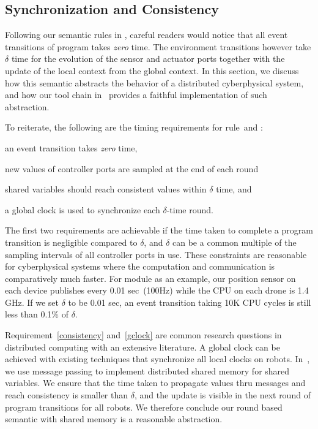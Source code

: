 \subsection{Synchronization and Consistency}
\label{sec:sync}

Following our semantic rules in ,
careful readers would notice that all event transitions of \lgname program takes \emph{zero} time.
The environment transitions however take $\delta$ time for the evolution of the sensor and actuator ports
together with the update of the local context from the global context.
In this section, we discuss how this semantic abstracts the behavior of a distributed cyberphysical system,
and how our tool chain in~\cite{ghosh2019cyphyhouse} provides a faithful implementation of such abstraction.

To reiterate, the following are the timing requirements for rule~\EventTransRule and \EnvTransRule:
\begin{inparaenum}[(a)]
\item an event transition takes \emph{zero} time,
\item new values of controller ports are sampled at the end of each round
\item \label{consistency} shared variables should reach consistent values within $\delta$ time, and
\item \label{gclock} a global clock is used to synchronize each $\delta$-time round.
\end{inparaenum}
The first two requirements are achievable if the time taken to complete a program transition is negligible compared to $\delta$,
and $\delta$ can be a common multiple of the sampling intervals of all controller ports in use.
These constraints are reasonable for cyberphysical systems where the computation and communication is comparatively much faster.
For \Motion module as an example, our position sensor on each device publishes every 0.01 sec~(100Hz) while the CPU on each drone is 1.4 GHz.
If we set $\delta$ to be 0.01 sec, an event transition taking 10K CPU cycles is still less than 0.1\% of $\delta$.

Requirement~\eqref{consistency} and~\eqref{gclock} are common research questions in distributed computing with an extensive literature.
A global clock can be achieved with existing techniques that synchronize all local clocks on robots.
In~\cite{ghosh2019cyphyhouse}, we use message passing to implement distributed shared memory for shared variables.
We ensure that the time taken to propagate values thru messages and reach consistency is smaller than $\delta$,
and the update is visible in the next round of program transitions for all robots.
We therefore conclude our round based semantic with shared memory is a reasonable abstraction.

